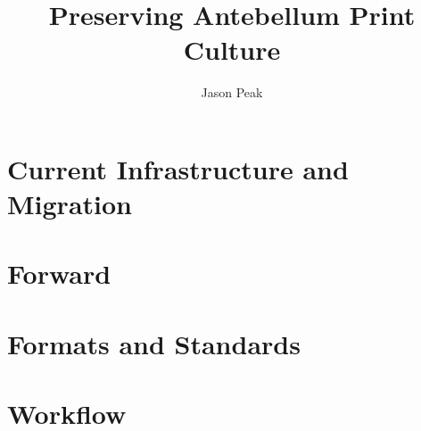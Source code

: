 \documentclass[oneside]{article}
\begin{document}
\title{Preserving Antebellum Print Culture}
\author{Jason Peak}


\def\projectname{Poe's Magazine World}
\def\apc{Antebellum Print Culture}
\def\bwj{\emph{The Broadway Journal}}
\def\slm{\emph{Southern Literary Messenger}}
\def\bgm{\emph{Burton's Gentleman's Magazine}}
\def\gm{\emph{Graham's Magazine}}
\def\maglist{\bgm, \bwj, \gm, and the \slm}

\def\needcite{[citation]}
\def\needswork{[needs much work for inclusion]}

%

%

%




%

\section{Current Infrastructure and Migration}


\section{Forward}


\section{Formats and Standards}


\section{Workflow}

\end{document}
